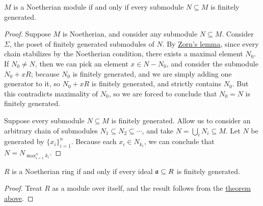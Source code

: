 \begin{theorem}\label{thm:noetherian-generated}
    \(M\) is a Noetherian module if and only if every submodule \(N \subseteq M\) is finitely generated.
\end{theorem}
\begin{proof}
    Suppose \(M\) is Noetherian, and consider any submodule \(N \subseteq M\).
    Consider \(\Sigma\), the poset of finitely generated submodules of \(N\).
    By \hyperref[ax:zorn]{Zorn's lemma},
    since every chain stabilizes by the Noetherian condition,
    there exists a maximal element \(N_0\).
    If \(N_0 \neq N\), then we can pick an element \(x \in N - N_0\),
    and consider the submodule \(N_0 + xR\);
    because \(N_0\) is finitely generated, and we are simply adding one generator to it,
    so \(N_0 + xR\) is finitely generated, and strictly contains \(N_0\).
    But this contradicts maximality of \(N_0\),
    so we are forced to conclude that \(N_0 = N\) is finitely generated.

    Suppose every submodule \(N \subseteq M\) is finitely generated.
    Allow us to consider an arbitrary chain of submodules \(N_1 \subseteq N_2 \subseteq \cdots\),
    and take \(N = \bigcup_i N_i \subseteq M\).
    Let \(N\) be generated by \({\{x_i\}}_{i=1}^n\).
    Because each \(x_i \in N_{k_i}\), we can conclude that \(N = N_{\max_{i=1}^n k_i}\).
\end{proof}
\begin{corollary}\label{cor:noetherian-generated}
    \(R\) is a Noetherian ring if and only if every ideal \(\mathfrak{a} \subseteq R\) is finitely generated.
\end{corollary}
\begin{proof}
    Treat \(R\) as a module over itself,
    and the result follows from the \hyperref[thm:noetherian-generated]{theorem above}.
\end{proof}

